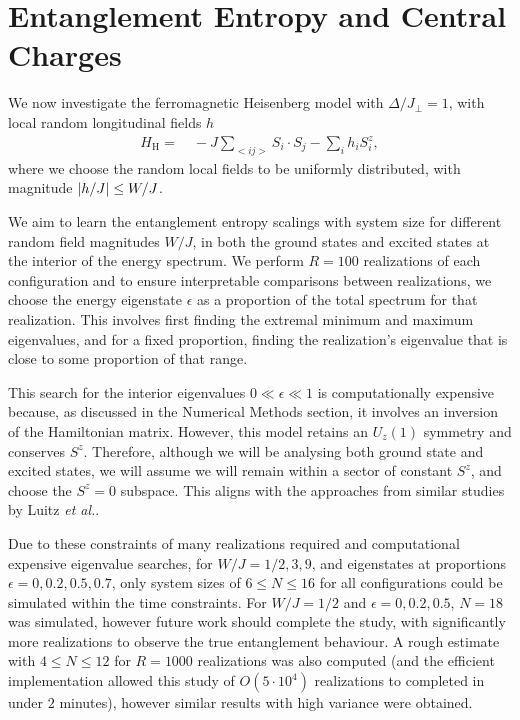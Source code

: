 \documentclass[12pt]{article}{}
\begin{document}
\newpage
\section{Entanglement Entropy and Central Charges}
We now investigate the ferromagnetic Heisenberg model with $\Delta/J_{\perp} = 1$, with local random longitudinal fields $h$
\begin{align}
  H_{\textrm{H}} =&~ -J\sum_{<ij>} S_{i} \cdot S_{j} - \sum_{i} h_{i}S^{z}_{i}, \label{eq:heisenberg_hamiltonian}
\end{align}
where we choose the random local fields to be uniformly distributed, with magnitude $\abs{h/J} \leq W/J$.

We aim to learn the entanglement entropy scalings with system size for different random field magnitudes $W/J$, in both the ground states and excited states at the interior of the energy spectrum. We perform $R = 100$ realizations of each configuration and to ensure interpretable comparisons between realizations, we choose the energy eigenstate $\epsilon$ as a proportion of the total spectrum for that realization. This involves first finding the extremal minimum and maximum eigenvalues, and for a fixed proportion, finding the realization's eigenvalue that is close to some proportion of that range. 

This search for the interior eigenvalues $0 \ll \epsilon \ll 1$ is computationally expensive because, as discussed in the Numerical Methods section, it involves an inversion of the Hamiltonian matrix. However, this model retains an $U_z(1)$ symmetry and conserves $S^{z}$. Therefore, although we will be analysing both ground state and excited states, we will assume we will remain within a sector of constant $S^z$, and choose the $S^{z} = 0$ subspace. This aligns with the approaches from similar studies by Luitz \emph{et al.}\cite{Luitz2014}. 

Due to these constraints of many realizations required and computational expensive eigenvalue searches, for $W/J = 1/2,3,9$, and eigenstates at proportions $\epsilon = 0,0.2,0.5,0.7$, only system sizes of $6 \leq N \leq 16$ for all configurations could be simulated within the time constraints. For $W/J = 1/2$ and $\epsilon = 0, 0.2, 0.5$, $N = 18$ was simulated, however future work should complete the study, with significantly more realizations to observe the true entanglement behaviour. A rough estimate with $4 \leq N \leq 12$ for $R = 1000$ realizations was also computed (and the efficient implementation allowed this study of $O(5 \cdot 10^4)$ realizations to completed in under $2$ minutes), however similar results with high variance were obtained.
\end{document}
